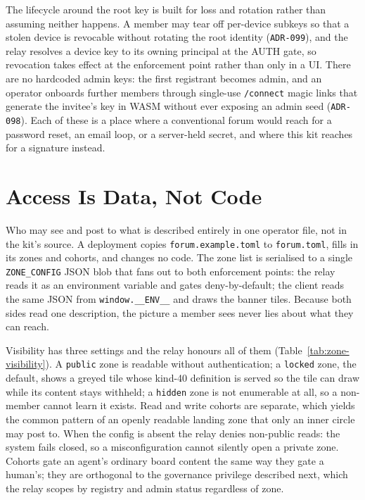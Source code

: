 The lifecycle around the root key is built for loss and rotation rather than assuming neither happens. A member may tear off per-device subkeys so that a stolen device is revocable without rotating the root identity (\texttt{ADR-099}), and the relay resolves a device key to its owning principal at the AUTH gate, so revocation takes effect at the enforcement point rather than only in a UI. There are no hardcoded admin keys: the first registrant becomes admin, and an operator onboards further members through single-use \texttt{/connect} magic links that generate the invitee's key in WASM without ever exposing an admin seed (\texttt{ADR-098}). Each of these is a place where a conventional forum would reach for a password reset, an email loop, or a server-held secret, and where this kit reaches for a signature instead.

\section{Access Is Data, Not Code}

Who may see and post to what is described entirely in one operator file, not in the kit's source. A deployment copies \texttt{forum.example.toml} to \texttt{forum.toml}, fills in its zones and cohorts, and changes no code. The zone list is serialised to a single \texttt{ZONE\_CONFIG} JSON blob that fans out to both enforcement points: the relay reads it as an environment variable and gates deny-by-default; the client reads the same JSON from \texttt{window.\_\_ENV\_\_} and draws the banner tiles. Because both sides read one description, the picture a member sees never lies about what they can reach.

Visibility has three settings and the relay honours all of them (Table~\ref{tab:zone-visibility}). A \texttt{public} zone is readable without authentication; a \texttt{locked} zone, the default, shows a greyed tile whose kind-40 definition is served so the tile can draw while its content stays withheld; a \texttt{hidden} zone is not enumerable at all, so a non-member cannot learn it exists. Read and write cohorts are separate, which yields the common pattern of an openly readable landing zone that only an inner circle may post to. When the config is absent the relay denies non-public reads: the system fails closed, so a misconfiguration cannot silently open a private zone. Cohorts gate an agent's ordinary board content the same way they gate a human's; they are orthogonal to the governance privilege described next, which the relay scopes by registry and admin status regardless of zone.

